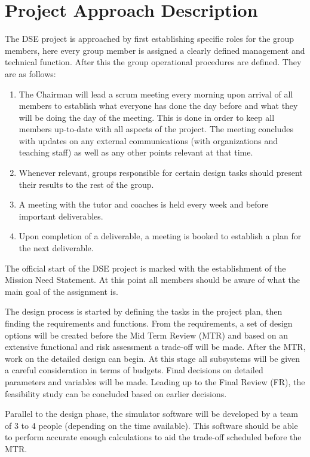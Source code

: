 \section{Project Approach Description}
\label{dseProjectApproachDescription}
The DSE project is approached by first establishing specific roles for the group members, here every group member is assigned a clearly defined management and technical function. After this the group operational procedures are defined. They are as follows:

\begin{enumerate}
	\item The Chairman will lead a scrum meeting every morning upon arrival of all members to establish what everyone has done the day before and what they will be doing the day of the meeting. This is done in order to keep all members up-to-date with all aspects of the project. The meeting concludes with updates on any external communications (with organizations and teaching staff) as well as any other points relevant at that time.
	\item Whenever relevant, groups responsible for certain design tasks should present their results to the rest of the group.
	\item A meeting with the tutor and coaches is held every week and before important deliverables.
	\item Upon completion of a deliverable, a meeting is booked to establish a plan for the next deliverable.  
\end{enumerate}

The official start of the DSE project is marked with the establishment of the Mission Need Statement. At this point all members should be aware of what the main goal of the assignment is.

The design process is started by defining the tasks in the project plan, then finding the requirements and functions. From the requirements, a set of design options will be created before the Mid Term Review (MTR) and based on an extensive functional and risk assessment a trade-off will be made. After the MTR, work on the detailed design can begin. At this stage all subsystems will be given a careful consideration in terms of budgets. Final decisions on detailed parameters and variables will be made. Leading up to the Final Review (FR), the feasibility study can be concluded based on earlier decisions.

Parallel to the design phase, the simulator software will be developed by a team of 3 to 4 people (depending on the time available). This software should be able to perform accurate enough calculations to aid the trade-off scheduled before the MTR.